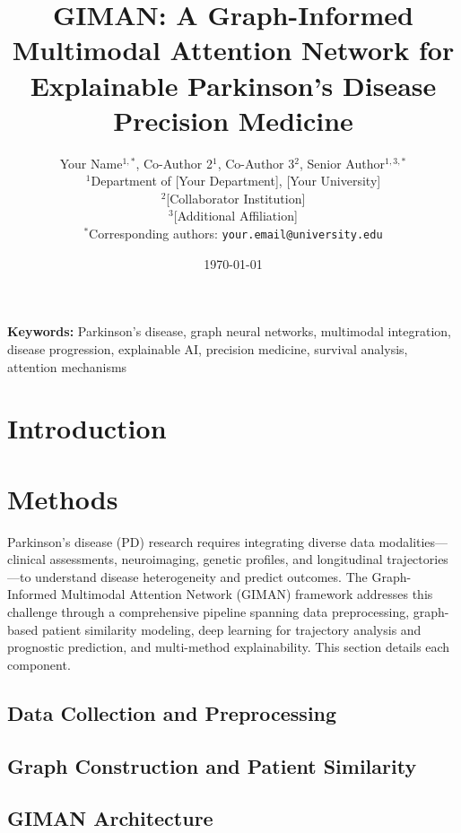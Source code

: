 \documentclass[9pt,twocolumn]{article}
\title{
    \Large\textbf{GIMAN: A Graph-Informed Multimodal Attention Network for Explainable Parkinson's Disease Precision Medicine}
}
\author{
    Your Name$^{1,*}$, 
    Co-Author 2$^{1}$, 
    Co-Author 3$^{2}$, 
    Senior Author$^{1,3,*}$ \\
    \small $^{1}$Department of [Your Department], [Your University] \\
    \small $^{2}$[Collaborator Institution] \\
    \small $^{3}$[Additional Affiliation] \\
    \small $^{*}$Corresponding authors: \texttt{your.email@university.edu}
}
\date{\today}
\newcommand{\giman}{\textsc{GIMAN}}
\newcommand{\pd}{\textsc{PD}}
\begin{document}
\maketitle

\linenumbers

\begin{abstract}

\end{abstract}

\noindent\textbf{Keywords:} Parkinson's disease, graph neural networks, multimodal integration, disease progression, explainable AI, precision medicine, survival analysis, attention mechanisms

\section{Introduction}


\section{Methods}
\label{sec:methods}

Parkinson's disease (\pd) research requires integrating diverse data modalities—clinical assessments, neuroimaging, genetic profiles, and longitudinal trajectories—to understand disease heterogeneity and predict outcomes. The Graph-Informed Multimodal Attention Network (\giman) framework addresses this challenge through a comprehensive pipeline spanning data preprocessing, graph-based patient similarity modeling, deep learning for trajectory analysis and prognostic prediction, and multi-method explainability. This section details each component.

\subsection{Data Collection and Preprocessing}
\label{sec:methods:preprocessing}


\subsection{Graph Construction and Patient Similarity}
\label{sec:methods:graph}


\subsection{GIMAN Architecture}
\label{sec:methods:giman}

\end{document}
